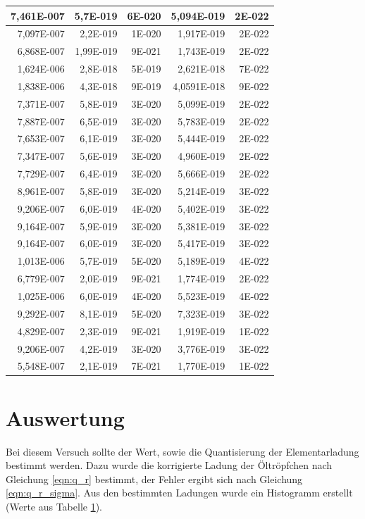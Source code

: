 \documentclass[12pt]{scrartcl}
\begin{document}
\begin{table}[H]
\begin{center}
\begin{tabular}{|r|r|r|r|r|}
7,461E-007 & 5,7E-019 & 6E-020 & 5,094E-019 & 2E-022 \\ \hline
7,097E-007 & 2,2E-019 & 1E-020 & 1,917E-019 & 2E-022 \\ \hline
6,868E-007 & 1,99E-019 & 9E-021 & 1,743E-019 & 2E-022 \\ \hline
1,624E-006 & 2,8E-018 & 5E-019 & 2,621E-018 & 7E-022 \\ \hline
1,838E-006 & 4,3E-018 & 9E-019 & 4,0591E-018 & 9E-022 \\ \hline
7,371E-007 & 5,8E-019 & 3E-020 & 5,099E-019 & 2E-022 \\ \hline
7,887E-007 & 6,5E-019 & 3E-020 & 5,783E-019 & 2E-022 \\ \hline
7,653E-007 & 6,1E-019 & 3E-020 & 5,444E-019 & 2E-022 \\ \hline
7,347E-007 & 5,6E-019 & 3E-020 & 4,960E-019 & 2E-022 \\ \hline
7,729E-007 & 6,4E-019 & 3E-020 & 5,666E-019 & 2E-022 \\ \hline
8,961E-007 & 5,8E-019 & 3E-020 & 5,214E-019 & 3E-022 \\ \hline
9,206E-007 & 6,0E-019 & 4E-020 & 5,402E-019 & 3E-022 \\ \hline
9,164E-007 & 5,9E-019 & 3E-020 & 5,381E-019 & 3E-022 \\ \hline
9,164E-007 & 6,0E-019 & 3E-020 & 5,417E-019 & 3E-022 \\ \hline
1,013E-006 & 5,7E-019 & 5E-020 & 5,189E-019 & 4E-022 \\ \hline
6,779E-007 & 2,0E-019 & 9E-021 & 1,774E-019 & 2E-022 \\ \hline
1,025E-006 & 6,0E-019 & 4E-020 & 5,523E-019 & 4E-022 \\ \hline
9,292E-007 & 8,1E-019 & 5E-020 & 7,323E-019 & 3E-022 \\ \hline
4,829E-007 & 2,3E-019 & 9E-021 & 1,919E-019 & 1E-022 \\ \hline
9,206E-007 & 4,2E-019 & 3E-020 & 3,776E-019 & 3E-022 \\ \hline
5,548E-007 & 2,1E-019 & 7E-021 & 1,770E-019 & 1E-022 \\ \hline
\end{tabular}
\end{center}
\label{tab:messwerte_3}
\end{table}


\section{Auswertung}
Bei diesem Versuch sollte der Wert, sowie die Quantisierung der Elementarladung bestimmt werden. Dazu wurde die korrigierte Ladung der Öltröpfchen nach Gleichung \ref{eqn:q_r} bestimmt, der Fehler ergibt sich nach Gleichung \ref{eqn:q_r_sigma}. Aus den bestimmten Ladungen wurde ein Histogramm erstellt (Werte aus Tabelle \ref{tab:messwerte_3}).
\end{document}
